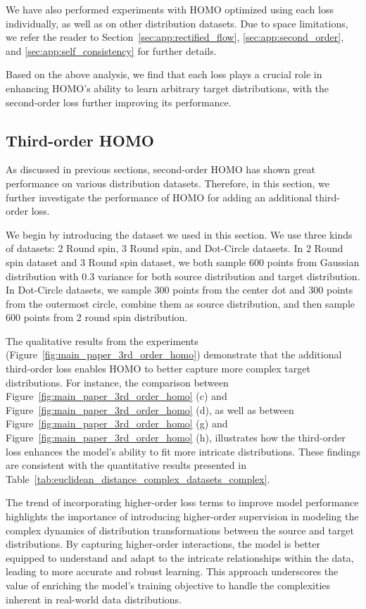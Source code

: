 We have also performed experiments with HOMO optimized using each loss individually, as well as on other distribution datasets. Due to space limitations, we refer the reader to Section~\ref{sec:app:rectified_flow}, \ref{sec:app:second_order}, and \ref{sec:app:self_consistency} for further details.

Based on the above analysis, we find that each loss plays a crucial role in enhancing HOMO's ability to learn arbitrary target distributions, with the second-order loss further improving its performance.

\subsection{Third-order HOMO}

As discussed in previous sections, second-order HOMO has shown great performance on various distribution datasets. Therefore, in this section, we further investigate the performance of HOMO for adding an additional third-order loss.

We begin by introducing the dataset we used in this section.
We use three kinds of datasets: 2 Round spin, 3 Round spin, and Dot-Circle datasets. In 2 Round spin dataset and 3 Round spin dataset, we both sample 600 points from Gaussian distribution with $0.3$ variance for both source distribution and target distribution. In Dot-Circle datasets, we sample 300 points from the center dot and 300 points from the outermost circle, combine them as source distribution, and then sample 600 points from 2 round spin distribution. 

The qualitative results from the experiments (Figure~\ref{fig:main_paper_3rd_order_homo}) demonstrate that the additional third-order loss enables HOMO to better capture more complex target distributions. For instance, the comparison between Figure~\ref{fig:main_paper_3rd_order_homo} (c) and Figure~\ref{fig:main_paper_3rd_order_homo} (d), as well as between Figure~\ref{fig:main_paper_3rd_order_homo} (g) and Figure~\ref{fig:main_paper_3rd_order_homo} (h), illustrates how the third-order loss enhances the model's ability to fit more intricate distributions. These findings are consistent with the quantitative results presented in Table~\ref{tab:euclidean_distance_complex_datasets_complex}.

The trend of incorporating higher-order loss terms to improve model performance highlights the importance of introducing higher-order supervision in modeling the complex dynamics of distribution transformations between the source and target distributions. By capturing higher-order interactions, the model is better equipped to understand and adapt to the intricate relationships within the data, leading to more accurate and robust learning. This approach underscores the value of enriching the model's training objective to handle the complexities inherent in real-world data distributions.


